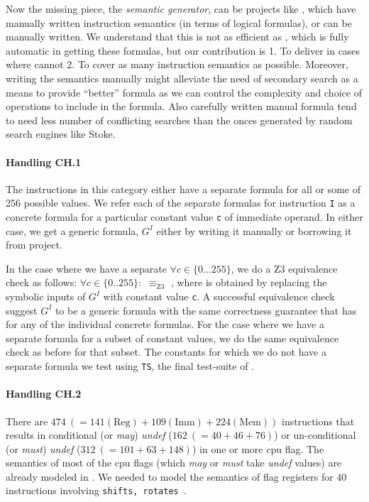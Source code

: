    Now the missing piece, the  \emph{semantic generator}, can be  projects like
   \Stoke, which have manually written instruction semantics (in terms of
       logical formulas), or can be manually written.  We understand that this
   is not as efficient as \Stoke, which is fully automatic in getting these
   formulas, but our contribution is 1. To deliver in cases where \Stoke cannot
   2. To cover  as many instruction semantics as possible. Moreover, writing the
   semantics manually might alleviate the need of secondary search as a means to
   provide ``better'' formula as we can control the complexity and choice of
   operations to include in the formula. Also carefully written manual formula
   tend to need less number of conflicting searches than the onces generated by
   random search engines like Stoke.
   
   \paragraph{Handling CH.1} The instructions in this category either  have a
   separate formula for all or some of 256 possible values. We refer each of the
   separate formulas for instruction {\tt I} as a concrete formula  for
   a particular constant value {\tt c} of immediate operand.  In either case, we get a generic formula, $G^I$ either by
   writing it manually or borrowing it from  \Stoke project.
   
   In the case where
   we have a separate  $\forall c \in \{0...255\}$, we do a Z3
   equivalence check as follows: $\forall c \in \{0..255\}:$  $\equiv_\text{Z3}$
   , where  is obtained by replacing the symbolic inputs of
   $G^I$ with constant value {\tt c}. A successful equivalence check suggest
   $G^I$ to be a generic formula with the same correctness guarantee that
   \Strata has for any of the individual concrete formulas. For the case where
   we have a separate formula for a subset of constant values, we do the same
   equivalence check as before for that subset. The constants for which we do
   not have a separate formula we test  using {\tt TS}, the final
   test-suite of \Strata. 
    
    \paragraph{Handling CH.2}
    
    There are $474\ (= 141(\text{Reg}) + 109(\text{Imm}) + 224(\text{Mem}))$ instructions that results in conditional  (or \emph{may}) \emph{undef} ($162\ (= 40 + 46 + 76)$) or un-conditional (or \emph{must}) \emph{undef} ($312\ (= 101 + 63 + 148)$)  in one or more cpu flag. 
    The semantics of most of the cpu flags (which \emph{may} or \emph{must} take \emph{undef} values) are already modeled in \Stoke. We needed to model the semantics of flag registers for $40$ instructions involving {\tt shifts, rotates}~\cite{BugStoke986}. 
    
